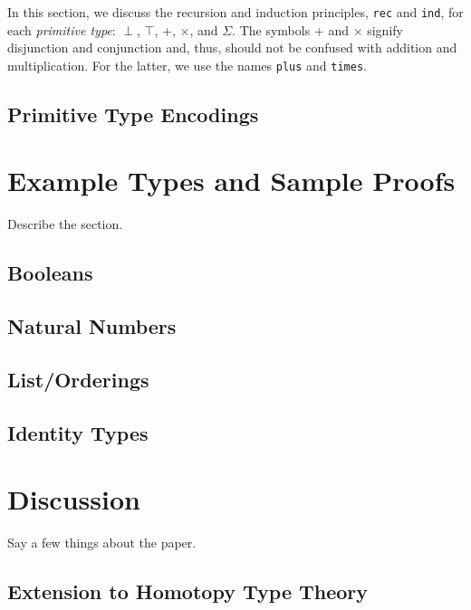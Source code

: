 \documentclass[12pt]{article}
\begin{document}
In this section, we discuss the recursion and induction principles, {\tt rec}
and {\tt ind}, for each {\em primitive type}: \(\perp\), \(\top\), +,
\(\times\), and \(\Sigma\). The symbols + and \(\times\) signify disjunction
and conjunction and, thus, should not be confused with addition and
multiplication. For the latter, we use the names {\tt plus} and {\tt times}.

\subsection*{Primitive Type Encodings}

\section{Example Types and Sample Proofs}
Describe the section.

\subsection*{Booleans}
\subsection*{Natural Numbers}
\subsection*{List/Orderings}
\subsection*{Identity Types}

\section{Discussion}
Say a few things about the paper.

\subsection*{Extension to Homotopy Type Theory}
\end{document}
